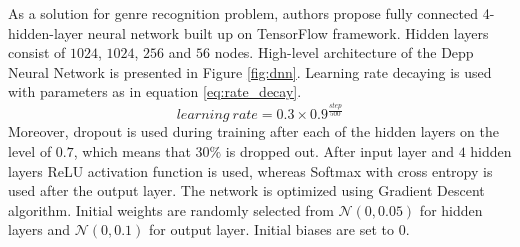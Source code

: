 As a solution for genre recognition problem, authors propose fully connected 4-hidden-layer neural network built up on TensorFlow framework. Hidden layers consist of $1024$, $1024$, $256$ and $56$ nodes. High-level architecture of the Depp Neural Network is presented in Figure \ref{fig:dnn}. Learning rate decaying is used with parameters as in equation \ref{eq:rate_decay}.
\begin{equation}
learning\ rate = 0.3 \times 0.9^{\frac{step}{500}}
\label{eq:rate_decay}
\end{equation}
Moreover, dropout is used during training after each of the hidden layers on the level of $0.7$, which means that $30\%$ is dropped out. After input layer and $4$ hidden layers ReLU activation function is used, whereas Softmax with cross entropy is used after the output layer. The network is optimized using Gradient Descent algorithm. Initial weights are randomly selected from $\mathcal{N}(0,0.05)$ for hidden layers and $\mathcal{N}(0,0.1)$ for output layer. Initial biases are set to $0$. 

